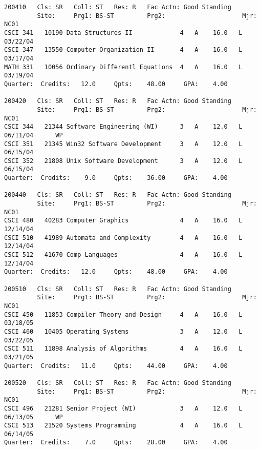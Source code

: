 \documentclass[line]{res}
\begin{document}
\begin{resume}
\begin{verbatim}
200410   Cls: SR   Coll: ST   Res: R   Fac Actn: Good Standing    
         Site:     Prg1: BS-ST         Prg2:                     Mjr: NC01
CSCI 341   10190 Data Structures II             4   A    16.0   L  03/22/04                          
CSCI 347   13550 Computer Organization II       4   A    16.0   L  03/17/04                          
MATH 331   10056 Ordinary Differentl Equations  4   A    16.0   L  03/19/04                          
Quarter:  Credits:   12.0     Qpts:    48.00     GPA:    4.00
                                                                                
200420   Cls: SR   Coll: ST   Res: R   Fac Actn: Good Standing    
         Site:     Prg1: BS-ST         Prg2:                     Mjr: NC01
CSCI 344   21344 Software Engineering (WI)      3   A    12.0   L  06/11/04      WP                  
CSCI 351   21345 Win32 Software Development     3   A    12.0   L  06/15/04                          
CSCI 352   21808 Unix Software Development      3   A    12.0   L  06/15/04                          
Quarter:  Credits:    9.0     Qpts:    36.00     GPA:    4.00
                                                                                
200440   Cls: SR   Coll: ST   Res: R   Fac Actn: Good Standing    
         Site:     Prg1: BS-ST         Prg2:                     Mjr: NC01
CSCI 480   40283 Computer Graphics              4   A    16.0   L  12/14/04                          
CSCI 510   41989 Automata and Complexity        4   A    16.0   L  12/14/04                          
CSCI 512   41670 Comp Languages                 4   A    16.0   L  12/14/04                          
Quarter:  Credits:   12.0     Qpts:    48.00     GPA:    4.00
                                                                                
200510   Cls: SR   Coll: ST   Res: R   Fac Actn: Good Standing    
         Site:     Prg1: BS-ST         Prg2:                     Mjr: NC01
CSCI 450   11853 Compiler Theory and Design     4   A    16.0   L  03/18/05                          
CSCI 460   10405 Operating Systems              3   A    12.0   L  03/22/05                          
CSCI 511   11898 Analysis of Algorithms         4   A    16.0   L  03/21/05                          
Quarter:  Credits:   11.0     Qpts:    44.00     GPA:    4.00
                                                                                
200520   Cls: SR   Coll: ST   Res: R   Fac Actn: Good Standing    
         Site:     Prg1: BS-ST         Prg2:                     Mjr: NC01
CSCI 496   21281 Senior Project (WI)            3   A    12.0   L  06/13/05      WP                  
CSCI 513   21520 Systems Programming            4   A    16.0   L  06/14/05                          
Quarter:  Credits:    7.0     Qpts:    28.00     GPA:    4.00
                                                                                

\end{verbatim}
\end{resume}
\end{document}
